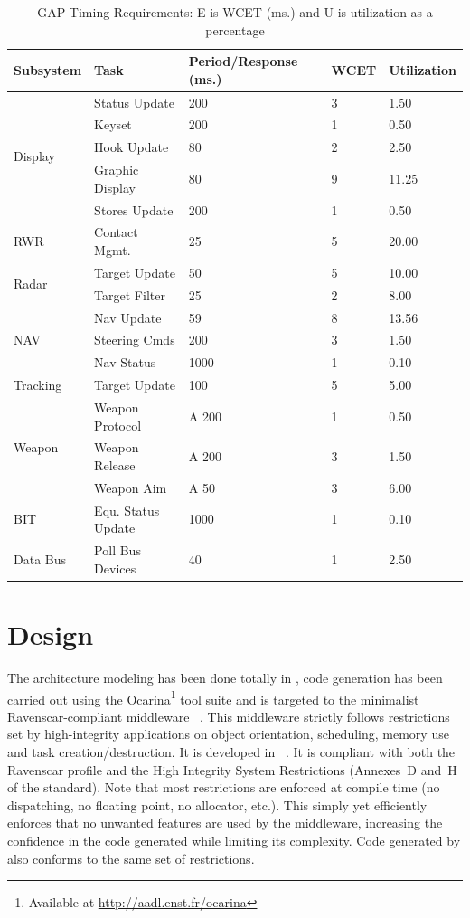 \begin{table}
\centering
\begin{tabular}{|l|l|l|l|l|}
\hline
\textbf{Subsystem} & \textbf{Task} & \textbf{Period/Response (ms.)} &
  \textbf{WCET} & \textbf{Utilization}\\
\hline
\multirow{5}{*}{Display} & Status Update & 200 & 3 & 1.50\\
 & Keyset & 200 & 1 & 0.50\\
 & Hook Update & 80 & 2 & 2.50\\
 & Graphic Display & 80 & 9 & 11.25\\
 & Stores Update & 200 & 1 & 0.50\\
\hline
RWR & Contact Mgmt. & 25 & 5 & 20.00\\
\hline
\multirow{2}{*}{Radar} & Target Update & 50 & 5 & 10.00\\
 & Target Filter & 25 & 2 & 8.00\\
\hline
\multirow{3}{*}{NAV} & Nav Update & 59 & 8 & 13.56\\
 & Steering Cmds & 200 & 3 & 1.50\\
 & Nav Status & 1000 & 1 & 0.10\\
\hline
Tracking & Target Update & 100 & 5 & 5.00\\
\hline
\multirow{3}{*}{Weapon} & Weapon Protocol & A 200 & 1 & 0.50\\
 & Weapon Release & A 200 & 3 & 1.50\\
 & Weapon Aim & A 50 & 3 & 6.00\\
\hline
BIT & Equ. Status Update & 1000 & 1 & 0.10\\
\hline
Data Bus & Poll Bus Devices & 40 & 1 & 2.50\\
\hline
\end{tabular}
\caption{GAP Timing Requirements: {\normalsize E is WCET (ms.) and U is
    utilization as a percentage}}
\label{tab:GAP_timing}
\end{table}

\section{Design}
\label{design}
The architecture modeling has been done totally in \aadl, code
generation has been carried out using the Ocarina\footnote{Available
  at \url{http://aadl.enst.fr/ocarina}} tool suite and is targeted to
the minimalist Ravenscar-compliant middleware
\polyorbhi{}~\cite{hugues@isorc07}. This middleware strictly follows
restrictions set by high-integrity applications on object orientation,
scheduling, memory use and task creation/destruction. It is developed
in \newada~\cite{arm05}. It is compliant with both the Ravenscar
profile and the High Integrity System Restrictions (Annexes~D and~H of
the \newada{} standard). Note that most restrictions are enforced at
compile time (no dispatching, no floating point, no allocator,
etc.). This simply yet efficiently enforces that no unwanted features
are used by the middleware, increasing the confidence in the code
generated while limiting its complexity. Code generated by \ocarina{}
also conforms to the same set of restrictions.

